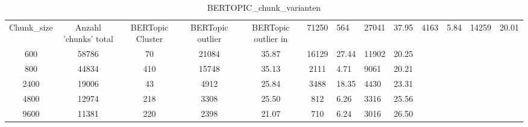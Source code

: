 \begin{table}
\caption{BERTOPIC_chunk_varianten}
\label{tab:BERTOPIC_chunk_varianten}
\begin{tabular}{cc|c|c|c|c}
\toprule
Chunk_size & Anzahl 'chunks' total & BERTopic Cluster & BERTopic outlier & BERTopic outlier in %
 & 71250 & 564 & 27041 & 37.95 & 4163 & 5.84 & 14259 & 20.01 \\
600 & 58786 & 70 & 21084 & 35.87 & 16129 & 27.44 & 11902 & 20.25 \\
800 & 44834 & 410 & 15748 & 35.13 & 2111 & 4.71 & 9061 & 20.21 \\
2400 & 19006 & 43 & 4912 & 25.84 & 3488 & 18.35 & 4430 & 23.31 \\
4800 & 12974 & 218 & 3308 & 25.50 & 812 & 6.26 & 3316 & 25.56 \\
9600 & 11381 & 220 & 2398 & 21.07 & 710 & 6.24 & 3016 & 26.50 \\
\bottomrule
\end{tabular}
\end{table}
